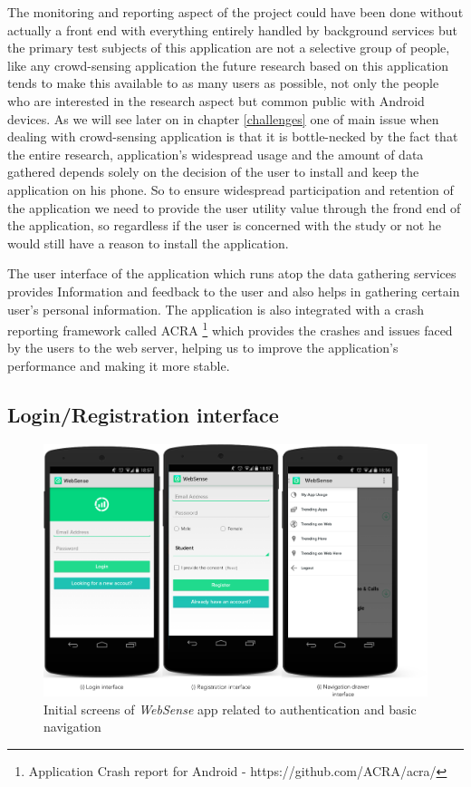 \documentclass[12pt]{report}
\begin{document}
The monitoring and reporting aspect of the project could have been done without actually a front end with everything entirely handled by background services but the primary test subjects of this application are not a selective group of people, like any crowd-sensing application the future research based on this application tends to make this available to as many users as possible, not only the people who are interested in the research aspect but common public with Android devices. As we will see later on in chapter \ref{challenges} one of main issue when dealing with crowd-sensing application is that it is bottle-necked by the fact that the entire research, application's widespread usage and the amount of data gathered depends solely on the decision of the user to install and keep the application on his phone. So to ensure widespread participation and retention of the application we need to provide the user utility value through the frond end of the application, so regardless if the user is concerned with the study or not he would still have a reason to install the application.

The user interface of the application which runs atop the data gathering services provides 
Information and feedback to the user and also helps in gathering certain user's personal information. The application is also integrated with a crash reporting framework called ACRA \footnote{Application Crash report for Android - https://github.com/ACRA/acra/} which provides the crashes and issues faced by the users to the web server, helping us to improve the application's performance and making it more stable.

\subsection{Login/Registration interface}
\label{LoginInterface}

\begin{figure}[htbp]
 \centering
 \includegraphics[width=150mm]{AppInitialScreen.png}
  \caption[Initial screens of \textit{WebSense} app.]{Initial screens of \textit{WebSense} app related to authentication and basic navigation}
 \label{figure:SensorInformation}
\end{figure}
\end{document}
